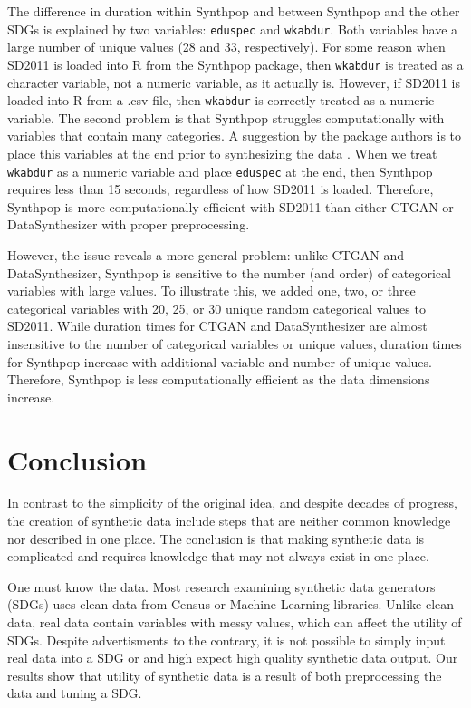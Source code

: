 \documentclass[runningheads]{llncs}
\begin{document}
The difference in duration within Synthpop and between Synthpop and the other SDGs is explained by two variables: \texttt{eduspec} and \texttt{wkabdur}.  Both variables have a large number of unique values (28 and 33, respectively).  For some reason when SD2011 is loaded into \textsf{R} from the Synthpop package, then \texttt{wkabdur} is treated as a character variable, not a numeric variable, as it actually is.  However, if SD2011 is loaded into \textsf{R} from a .csv file, then \texttt{wkabdur} is correctly treated as a numeric variable.  The second problem is that Synthpop struggles computationally with variables that contain many categories.  A suggestion by the package authors is to place this variables at the end prior to synthesizing the data \cite{raab2017guidelines}.  When we treat \texttt{wkabdur} as a numeric variable and place \texttt{eduspec} at the end, then Synthpop requires less than 15 seconds, regardless of how SD2011 is loaded.  Therefore, Synthpop is more computationally efficient with SD2011 than either CTGAN or DataSynthesizer with proper preprocessing.

However, the issue reveals a more general problem: unlike CTGAN and DataSynthesizer, Synthpop is sensitive to the number (and order) of categorical variables with large values.  To illustrate this, we added one, two, or three categorical variables with 20, 25, or 30 unique random categorical values to SD2011.  While duration times for CTGAN and DataSynthesizer are almost insensitive to the number of categorical variables or unique values, duration times for Synthpop increase with additional variable and number of unique values.  Therefore, Synthpop is less computationally efficient as the data dimensions increase. 

\section{Conclusion}\label{sec:conclusion}

In contrast to the simplicity of the original idea, and despite decades of progress, the creation of synthetic data include steps that are neither common knowledge nor described in one place.  The conclusion is that making synthetic data is complicated and requires knowledge that may not always exist in one place.  

One must know the data.  Most research examining synthetic data generators (SDGs) uses clean data from Census or Machine Learning libraries.  Unlike clean data, real data contain variables with messy values, which can affect the utility of SDGs.  Despite advertisments to the contrary, it is not possible to simply input real data into a SDG or and high expect high quality synthetic data output.  Our results show that utility of synthetic data is a result of both preprocessing the data and tuning a SDG.  
\end{document}

